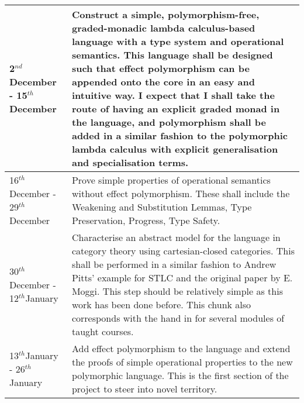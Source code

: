 \documentclass[11pt]{article}
\renewcommand{\th}{$^{th}$}
\newcommand{\nd}{$^{nd}$}
\begin{document}
\begin{tabular}{|p{6cm}||p{10cm}|}
\hline
	2\nd December - 15\th December & Construct a simple, polymorphism-free, graded-monadic lambda calculus-based language with a type system and operational semantics. This language shall be designed such that effect polymorphism can be appended onto the core in an easy and intuitive way. I expect that I shall take the route of having an explicit graded monad in the language, and polymorphism shall be added in a similar fashion to the polymorphic lambda calculus with explicit generalisation and specialisation terms.\\\hline
	16\th December - 29\th December & Prove simple properties of operational semantics without effect polymorphism. These shall include the Weakening and Substitution Lemmas, Type Preservation, Progress, Type Safety.\\\hline
	30\th December - 12\th January & Characterise an abstract model for the language in category theory using cartesian-closed categories. This shall be performed in a similar fashion to Andrew Pitts' example for STLC and the original paper by E. Moggi. This step should be relatively simple as this work has been done before. This chunk also corresponds with the hand in for several modules of taught courses.  \\\hline
	13\th January - 26\th January &  Add effect polymorphism to the language and extend the proofs of simple operational properties to the new polymorphic language. This is the first section of the project to steer into novel territory. \\\hline
	

\end{tabular}
\end{document}
